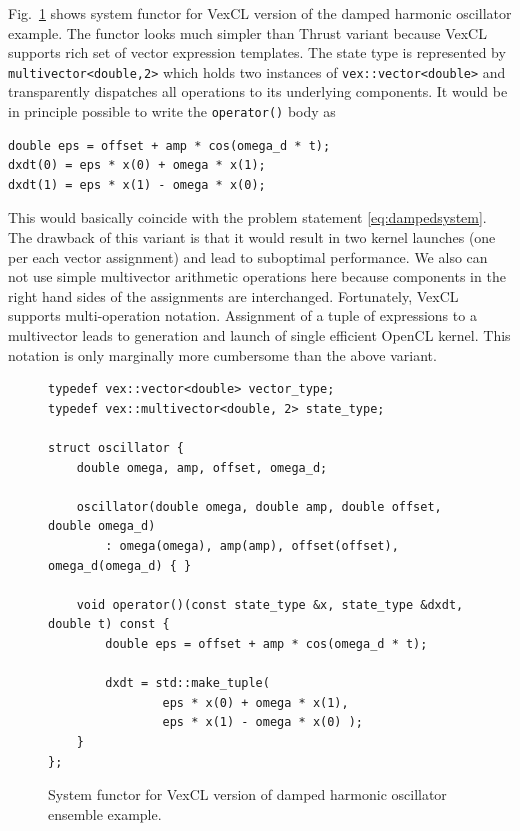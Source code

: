\documentclass[1p]{elsarticle}
\newcommand{\code}[1]{\lstinline|#1|}
\newcommand{\figref}[1]{Fig.~\ref{#1}}
\begin{document}
\figref{code:vexcl:damped} shows system functor for VexCL version of the damped
harmonic oscillator example. The functor looks much simpler than Thrust variant
because VexCL supports rich set of vector expression templates. The
state type is represented by \code{multivector<double,2>} which holds two
instances of \code{vex::vector<double>} and transparently dispatches all
operations to its underlying components. It would be in principle possible to
write the \code{operator()} body as
\begin{lstlisting}[frame=leftline]
double eps = offset + amp * cos(omega_d * t);
dxdt(0) = eps * x(0) + omega * x(1);
dxdt(1) = eps * x(1) - omega * x(0);
\end{lstlisting}
This would basically coincide with the problem statement
\eqref{eq:dampedsystem}. The drawback of this variant is that it would result
in two kernel launches (one per each vector assignment) and lead to suboptimal
performance. We also can not use simple multivector arithmetic operations here
because components in the right hand sides of the assignments are interchanged.
Fortunately, VexCL supports multi-operation notation. Assignment of a tuple of
expressions to a multivector leads to generation and launch of single efficient
OpenCL kernel. This notation is only marginally more cumbersome than the above
variant.

\begin{figure}[p]
\begin{lstlisting}
typedef vex::vector<double> vector_type;
typedef vex::multivector<double, 2> state_type;

struct oscillator {
    double omega, amp, offset, omega_d;

    oscillator(double omega, double amp, double offset, double omega_d)
        : omega(omega), amp(amp), offset(offset), omega_d(omega_d) { }

    void operator()(const state_type &x, state_type &dxdt, double t) const {
        double eps = offset + amp * cos(omega_d * t);

        dxdt = std::make_tuple(
                eps * x(0) + omega * x(1),
                eps * x(1) - omega * x(0) );
    }
};
\end{lstlisting}
\caption{System functor for VexCL version of damped harmonic oscillator
ensemble example.}
\label{code:vexcl:damped}
\end{figure}
\end{document}
